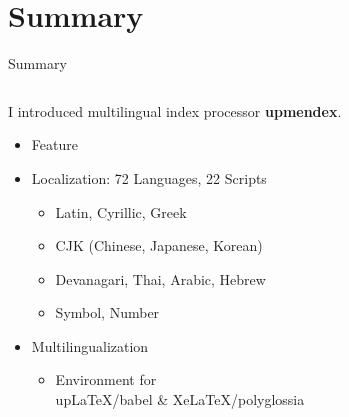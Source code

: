 \documentclass[aspectratio=169,10pt]{beamer}
\begin{document}
\section{Summary}
\begin{frame}{Summary}

\begin{columns}
\begin{column}{70mm}

I introduced multilingual index processor \textbf{upmendex}.

  \begin{itemize}
  \item Feature\\
  \item Localization: 72 Languages, 22 Scripts
     \begin{itemize}
      \item Latin, Cyrillic, Greek
      \item CJK (Chinese, Japanese, Korean)
      \item Devanagari, Thai, Arabic, Hebrew
      \item Symbol, Number
     \end{itemize}
  \item Multilingualization
     \begin{itemize}
      \item Environment for\\
        upLaTeX/babel \& XeLaTeX/polyglossia
     \end{itemize}
  \end{itemize}
\end{column}

\begin{column}{65mm}

\begin{center}
\end{center}
\end{column}
\end{columns}

\end{frame}

\end{document}
